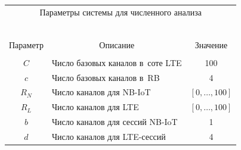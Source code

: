 \begin{table}[b]\small %


\begin{center}





    


    \begin{tabular}{|c|l|c|}


    \multicolumn{3}{c}{Параметры системы для численного анализа}\\


    \multicolumn{3}{c}{\ }\\[-6pt]


            \hline


            &&\\[-9pt]


            {Параметр}       & \multicolumn{1}{c|}{Описание}   &  Значение\\


            \hline


            &&\\[-9pt]


            $C$                           &Число базовых каналов в~соте  LTE & 100\\




            $c$                           &Число базовых каналов в~RB &  4\\




            $R_{N}$                 &Число каналов для NB-IoT &  


            $\left[ {0,\ldots ,100} \right]$\\




            $R_{L}$                     &Число каналов для LTE & $\left[ 


{0,\ldots ,100} \right]$\\




            $b$                         &Число каналов для сессий NB-IoT 


& 1\\




            $d$                         &Число каналов для LTE-сессий & 4\\



\end{tabular}
\end{center}
\end{table}
